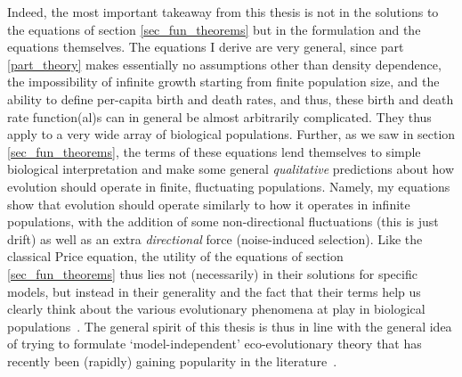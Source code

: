 Indeed, the most important takeaway from this thesis is not in the solutions to the equations of section \ref{sec_fun_theorems} but in the formulation and the equations themselves. The equations I derive are very general, since part \ref{part_theory} makes essentially no assumptions other than density dependence, the impossibility of infinite growth starting from finite population size, and the ability to define per-capita birth and death rates, and thus, these birth and death rate function(al)s can in general be almost arbitrarily complicated. They thus apply to a very wide array of biological populations. Further, as we saw in section \ref{sec_fun_theorems}, the terms of these equations lend themselves to simple biological interpretation and make some general \emph{qualitative} predictions about how evolution should operate in finite, fluctuating populations. Namely, my equations show that evolution should operate similarly to how it operates in infinite populations, with the addition of some non-directional fluctuations (this is just drift) as well as an extra \emph{directional} force (noise-induced selection). Like the classical Price equation, the utility of the equations of section \ref{sec_fun_theorems} thus lies not (necessarily) in their solutions for specific models, but instead in their generality and the fact that their terms help us clearly think about the various evolutionary phenomena at play in biological populations~\citep{frank_natural_2012,luque_one_2017, luque_mirror_2021}. The general spirit of this thesis is thus in line with the general idea of trying to formulate `model-independent' eco-evolutionary theory that has recently been (rapidly) gaining popularity in the literature~\citep{grafen_formal_2014, queller_fundamental_2017, lion_theoretical_2018, allen_mathematical_2019, rice_universal_2020, week_white_2021, wickman_theoretical_2022, kuosmanen_turnover_2022, mazzolini_universality_2022,lion_extending_2023,allen_natural_2023}.

